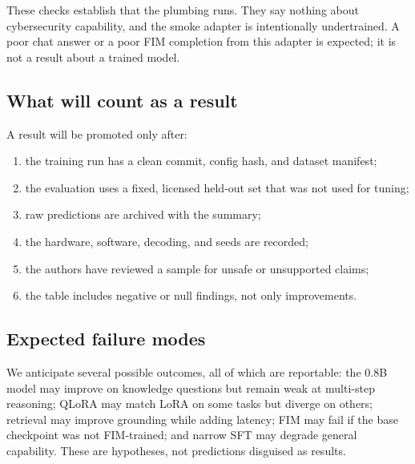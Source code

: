These checks establish that the plumbing runs. They say nothing about
cybersecurity capability, and the smoke adapter is intentionally undertrained.
A poor chat answer or a poor FIM completion from this adapter is expected; it is
not a result about a trained \cyberlite{} model.

\subsection{What will count as a result}

A result will be promoted only after:

\begin{enumerate}[leftmargin=1.4em]
  \item the training run has a clean commit, config hash, and dataset manifest;
  \item the evaluation uses a fixed, licensed held-out set that was not used for
  tuning;
  \item raw predictions are archived with the summary;
  \item the hardware, software, decoding, and seeds are recorded;
  \item the authors have reviewed a sample for unsafe or unsupported claims;
  \item the table includes negative or null findings, not only improvements.
\end{enumerate}

\subsection{Expected failure modes}

We anticipate several possible outcomes, all of which are reportable:
the 0.8B model may improve on knowledge questions but remain weak at multi-step
reasoning; QLoRA may match LoRA on some tasks but diverge on others; retrieval
may improve grounding while adding latency; FIM may fail if the base checkpoint
was not FIM-trained; and narrow SFT may degrade general capability. These are
hypotheses, not predictions disguised as results.
